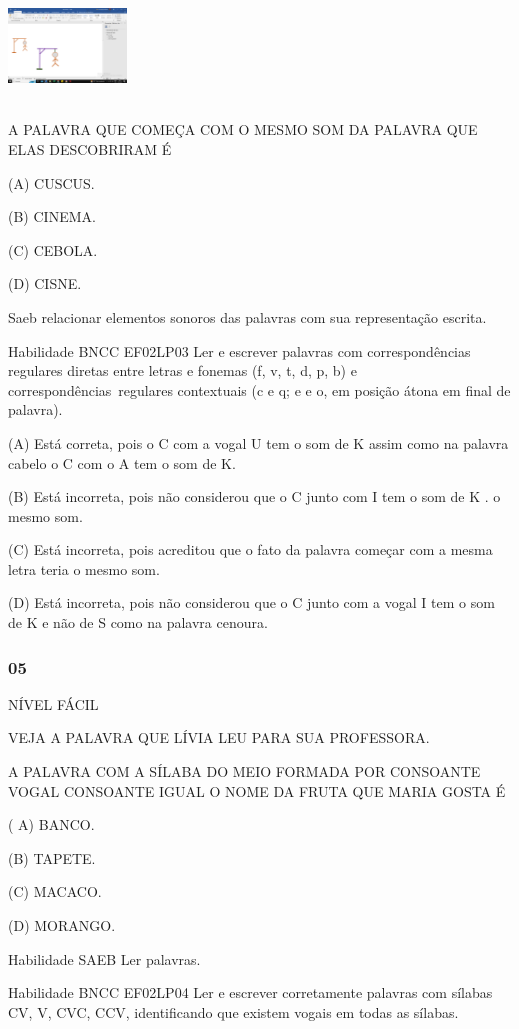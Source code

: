 \includegraphics[width=1.24236in,height=1.17500in]{media/image166.png}

A PALAVRA QUE COMEÇA COM O MESMO SOM DA PALAVRA QUE ELAS DESCOBRIRAM É

(A) CUSCUS.

(B) CINEMA.

(C) CEBOLA.

(D) CISNE.

Saeb relacionar elementos sonoros das palavras com sua representação
escrita.

Habilidade BNCC EF02LP03 Ler e escrever palavras com correspondências
regulares diretas entre letras e fonemas (f, v, t, d, p, b) e
correspondências~regulares contextuais (c e q; e e o, em posição átona
em final de palavra).

(A) Está correta, pois o C com a vogal U tem o som de K assim como na
palavra cabelo o C com o A tem o som de K.

(B) Está incorreta, pois não considerou que o C junto com I tem o som de
K . o mesmo som.

(C) Está incorreta, pois acreditou que o fato da palavra começar com a
mesma letra teria o mesmo som.

(D) Está incorreta, pois não considerou que o C junto com a vogal I tem
o som de K e não de S como na palavra cenoura.

\subsubsection{05 }\label{section-131}

NÍVEL FÁCIL

VEJA A PALAVRA QUE LÍVIA LEU PARA SUA PROFESSORA.

A PALAVRA COM A SÍLABA DO MEIO FORMADA POR CONSOANTE VOGAL CONSOANTE
IGUAL O NOME DA FRUTA QUE MARIA GOSTA É

( A) BANCO.

(B) TAPETE.

(C) MACACO.

(D) MORANGO.

Habilidade SAEB Ler palavras.

Habilidade BNCC EF02LP04 Ler e escrever corretamente palavras com
sílabas CV, V, CVC, CCV, identificando que existem vogais em todas as
sílabas.

